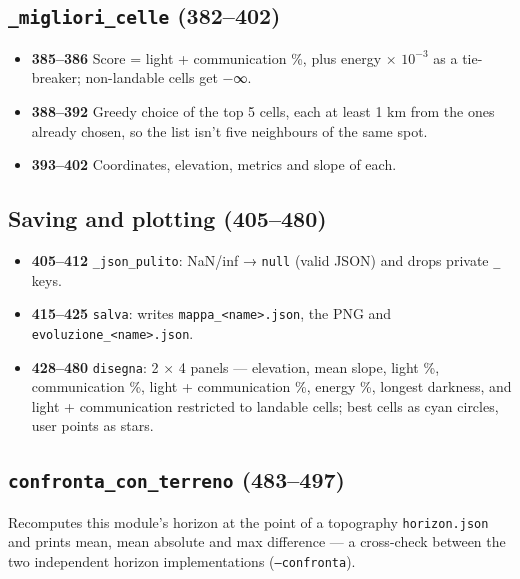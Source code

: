 \documentclass[11pt,a4paper]{article}
\providecommand{\tightlist}{\setlength{\itemsep}{0pt}\setlength{\parskip}{0pt}}
\begin{document}
\hypertarget{migliori_celle-382402}{%
\subsection{\texorpdfstring{\texttt{\_migliori\_celle}
(382--402)}{\_migliori\_celle (382--402)}}\label{migliori_celle-382402}}

\begin{itemize}
\tightlist
\item
  \textbf{385--386} Score = light + communication \%, plus energy × $10^{-3}$
  as a tie-breaker; non-landable cells get −∞.
\item
  \textbf{388--392} Greedy choice of the top 5 cells, each at least 1 km
  from the ones already chosen, so the list isn't five neighbours of the
  same spot.
\item
  \textbf{393--402} Coordinates, elevation, metrics and slope of each.
\end{itemize}

\hypertarget{saving-and-plotting-405480}{%
\subsection{Saving and plotting
(405--480)}\label{saving-and-plotting-405480}}

\begin{itemize}
\tightlist
\item
  \textbf{405--412} \texttt{\_json\_pulito}: NaN/inf →
  \texttt{null} (valid JSON) and drops private
  \texttt{\_} keys.
\item
  \textbf{415--425} \texttt{salva}: writes
  \texttt{mappa\_<name>.json}, the PNG and
  \texttt{evoluzione\_<name>.json}.
\item
  \textbf{428--480} \texttt{disegna}: 2 × 4 panels ---
  elevation, mean slope, light \%, communication \%, light +
  communication \%, energy \%, longest darkness, and light +
  communication restricted to landable cells; best cells as cyan
  circles, user points as stars.
\end{itemize}

\hypertarget{confronta_con_terreno-483497}{%
\subsection{\texorpdfstring{\texttt{confronta\_con\_terreno}
(483--497)}{confronta\_con\_terreno (483--497)}}\label{confronta_con_terreno-483497}}

Recomputes this module's horizon at the point of a topography
\texttt{horizon.json} and prints mean, mean absolute
and max difference --- a cross-check between the two independent horizon
implementations (\texttt{--confronta}).
\end{document}
